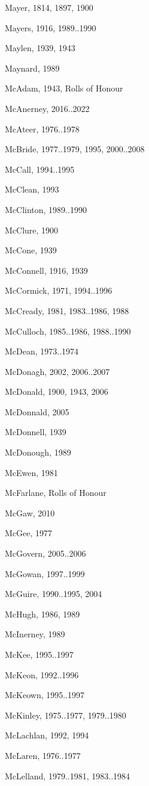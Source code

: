 {\begin{theindex}
\item Mayer, 1814, 1897, 1900
\item Mayers, 1916, 1989..1990
\item Maylen, 1939, 1943
\item Maynard, 1989
\item McAdam, 1943, Rolls of Honour
\item McAnerney, 2016..2022
\item McAteer, 1976..1978
\item McBride, 1977..1979, 1995, 2000..2008
\item McCall, 1994..1995
\item McClean, 1993
\item McClinton, 1989..1990
\item McClure, 1900
\item McCone, 1939
\item McConnell, 1916, 1939
\item McCormick, 1971, 1994..1996
\item McCready, 1981, 1983..1986, 1988
\item McCulloch, 1985..1986, 1988..1990
\item McDean, 1973..1974
\item McDonagh, 2002, 2006..2007
\item McDonald, 1900, 1943, 2006
\item McDonnald, 2005
\item McDonnell, 1939
\item McDonough, 1989
\item McEwen, 1981
\item McFarlane, Rolls of Honour
\item McGaw, 2010
\item McGee, 1977
\item McGovern, 2005..2006
\item McGowan, 1997..1999
\item McGuire, 1990..1995, 2004
\item McHugh, 1986, 1989
\item McInerney, 1989
\item McKee, 1995..1997
\item McKeon, 1992..1996
\item McKeown, 1995..1997
\item McKinley, 1975..1977, 1979..1980
\item McLachlan, 1992, 1994
\item McLaren, 1976..1977
\item McLelland, 1979..1981, 1983..1984

\end{theindex}}
